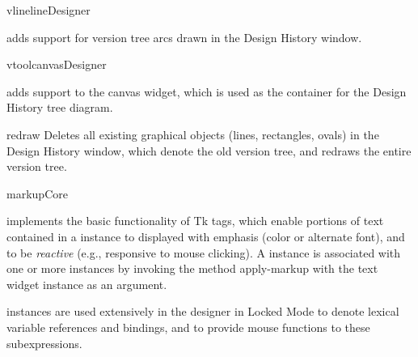 \documentclass{article}
\begin{document}
\begin{class}{vline}{line}{Designer}

 adds support for version tree arcs drawn in the Design
History window.
\end{class}



\begin{class}{vtool}{canvas}{Designer}

 adds support to the canvas widget, which is used as the
container for the Design History tree diagram.

\begin{method}{redraw}{}{}
Deletes all existing graphical objects (lines, rectangles, ovals) in
the Design History window, which denote the old version tree, and
redraws the entire version tree.
\end{method}
\end{class}






\begin{class}{markup}{}{Core}

 implements the basic functionality of Tk tags, which
enable portions of text contained in a  instance to
displayed with emphasis (color or alternate font), and to be {\em
reactive} (e.g., responsive to mouse clicking).  A 
instance is associated with one or more  instances by
invoking the  method {\sf apply-markup} with the text
widget instance as an argument.

 instances are used extensively in the designer in
Locked Mode to denote lexical variable references and bindings, and to
provide mouse functions to these subexpressions.
\end{class}
\end{document}
